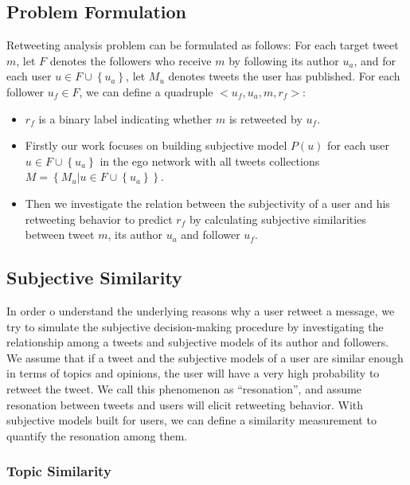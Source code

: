 \documentclass[letterpaper]{article}
\begin{document}
\subsection{Problem Formulation}
\label{formulation}

Retweeting analysis problem can be formulated as follows:
For each target tweet $ m $, let $ F $ denotes the followers who receive $ m $ by following its author $ u_{a} $, and for each user $ u \in F \cup \left\lbrace u_{a} \right\rbrace  $, let $ M_{u} $ denotes   tweets the user has published. 
For each follower $ u_{f} \in F $, we can define a quadruple $ <u_{f}, u_{a}, m, r_{f}>  $: 
\begin{itemize}
\item $ r_{f} $ is a binary label indicating whether $ m $ is retweeted by $ u_{f} $.
\item Firstly our work focuses on building subjective model $ P\left( u \right)  $ for each user $ u \in F \cup \left\lbrace u_{a} \right\rbrace $ in the ego network with all tweets collections $ M=\left\lbrace M_{u} | u \in F \cup \left\lbrace u_{a} \right\rbrace  \right\rbrace  $.
\item Then we investigate the relation between the subjectivity of a user and his retweeting behavior to predict $ r_{f} $ by calculating subjective similarities between tweet $ m $, its author $ u_{a} $ and follower $ u_{f} $. 
\end{itemize}

\subsection{Subjective Similarity}
\label{similarity}

In order o understand the underlying reasons why a user retweet a message, we try to simulate the subjective decision-making procedure by investigating the relationship among a tweets and subjective models of its author and followers. 
We assume that if a tweet and the subjective models of a user are similar enough in terms of topics and opinions, the user will have a very high probability to retweet the tweet. 
We call this phenomenon as ``resonation'', and assume resonation between tweets and users will elicit retweeting behavior.
With subjective models built for users, we can define a similarity measurement to quantify the resonation among them.

\subsubsection{Topic Similarity}
\label{topsim}
\end{document}

